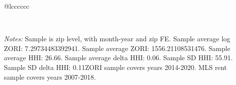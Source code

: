 \begin{table}[H]
{\begin{tabular}{@{\extracolsep{5pt}}lcccccc}
 \hline  

 \hline \\[-1.8ex]  

  {\parbox[t]{\textwidth}{ \textit{Notes:} Sample is zip level, with month-year and zip FE. Sample average log ZORI: 7.29734483392941. Sample average ZORI: 1556.21108531476. Sample average HHI: 26.66. Sample average delta HHI: 0.06. Sample SD HHI: 55.91. Sample SD delta HHI: 0.11ZORI sample covers years 2014-2020. MLS rent sample covers years 2007-2018.}} \\ 

 \end{tabular}}  

 \end{table}  

 



